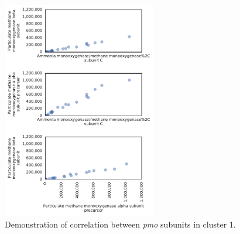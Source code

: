 \begin{figure}[H]
\centering
    \includegraphics[width=0.6\textwidth]{./tex/chapter3/figures/170402_correlations_between_pMMO_subunits--set1.pdf}
    \begin{singlespace}
    \caption[Demonstration of correlation between \textit{pmo} subniuts in cluster 1]{
        Demonstration of correlation between \textit{pmo} subunits in cluster 1.}
    \label{fig:pmo_cor1}
    \end{singlespace}
\end{figure}

